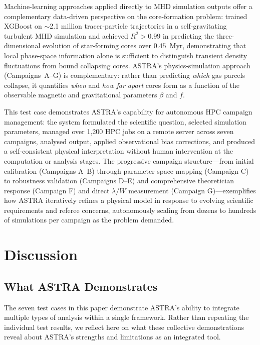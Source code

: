 \documentclass[usenatbib]{rasti}
\begin{document}
Machine-learning approaches applied directly to MHD simulation outputs offer a complementary data-driven perspective on the core-formation problem: \citet{bisht2026mlcores} trained XGBoost on $\sim$2.1 million tracer-particle trajectories in a self-gravitating turbulent MHD simulation and achieved $R^2 > 0.99$ in predicting the three-dimensional evolution of star-forming cores over $0.45$~Myr, demonstrating that local phase-space information alone is sufficient to distinguish transient density fluctuations from bound collapsing cores. ASTRA's physics-simulation approach (Campaigns~A--G) is complementary: rather than predicting \emph{which} gas parcels collapse, it quantifies \emph{when} and \emph{how far apart} cores form as a function of the observable magnetic and gravitational parameters $\beta$ and $f$.

This test case demonstrates ASTRA's capability for autonomous HPC campaign management:
the system formulated the scientific question, selected simulation parameters, managed over 1,200
HPC jobs on a remote server across seven campaigns, analysed output, applied observational bias
corrections, and produced a self-consistent physical interpretation without human intervention at
the computation or analysis stages. The progressive campaign structure---from initial calibration
(Campaigns A--B) through parameter-space mapping (Campaign C) to robustness validation (Campaigns
D--E) and comprehensive theoretician response (Campaign F) and direct $\lambda/W$ measurement
(Campaign G)---exemplifies how ASTRA iteratively refines a physical model in response to
evolving scientific requirements and referee concerns, autonomously scaling from dozens to
hundreds of simulations per campaign as the problem demanded.

\section{Discussion}

\subsection{What ASTRA Demonstrates}

The seven test cases in this paper demonstrate ASTRA's ability to integrate multiple types of analysis within a single framework. Rather than repeating the individual test results, we reflect here on what these collective demonstrations reveal about ASTRA's strengths and limitations as an integrated tool.
\end{document}
